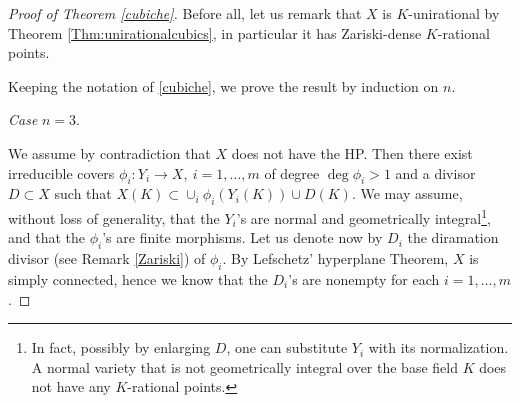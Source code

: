 \documentclass[a4paper,12pt]{article}
\begin{document}

\begin{proof}[Proof of Theorem \ref{cubiche}]
	
	Before all, let us remark that $X$ is $K$-unirational by Theorem \ref{Thm:unirationalcubics}, in particular it has Zariski-dense $K$-rational points.
	
	Keeping the notation of \ref{cubiche}, we prove the result by induction on $n$.
	
	\emph{Case} $n=3$.

	We assume by contradiction that $X$ does not have the HP. Then there exist irreducible covers $\phi_i: Y_i \rightarrow X, \ i=1, \dots, m$ of degree $\deg \phi_i >1$ and a divisor $D \subset X$ such that $X(K) \subset \cup_i \phi_i(Y_i(K)) \cup D(K)$. We may assume, without loss of generality, that the $Y_i$'s are normal and geometrically integral\footnote{In fact, possibly by enlarging $D$, one can substitute $Y_i$ with its normalization. A normal variety that is not geometrically integral over the base field $K$ does not have any $K$-rational points.}, and that the $\phi_i$'s are finite morphisms. Let us denote now by $D_i$ the diramation divisor (see Remark \ref{Zariski}) of $\phi_i$. By Lefschetz' hyperplane Theorem, $X$ is simply connected, hence we know that the $D_i$'s are nonempty for each $i=1, \dots, m$. 
	

\end{proof}
\end{document}
